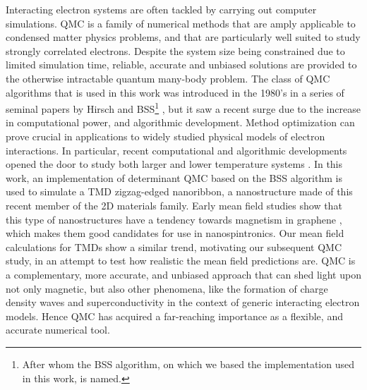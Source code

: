 Interacting electron systems are often tackled by carrying out computer simulations.
\ac{QMC} is a family of numerical methods that are  amply applicable to condensed matter physics problems, and that are particularly well suited to study strongly correlated electrons.
Despite the system size being constrained due to limited simulation time, reliable, accurate and unbiased solutions are provided to the otherwise intractable quantum many-body problem.
The class of \acs{QMC} algorithms that is used in this work was introduced in the 1980's in a series of seminal papers by Hirsch and \acl{BSS}\footnote{After whom the \ac{BSS} algorithm, on which we based the implementation used in this work, is named.} \cite{hirsch_discrete_1983, hirsch_monte_1982, blankenbecler_monte_1981, hirsch_two-dimensional_1985, hirsch_monte_1983, hirsch_stable_1988, hirsch_antiferromagnetism_1989}, but it saw a recent surge \cite{dumitrescu_superconductivity_2016, berg_monte_2018, beyl_revisiting_2018, chang_recent_2015, esterlis_breakdown_2018, mondaini_determinant_2012, meng_characterization_2014, kung_characterizing_2016, johnston_determinant_2013, rademaker_determinant_2013, ying_determinant_2014, scalettar_numerical_2007, zhou_quantum_2014} due to the increase in computational power, and algorithmic development.
Method optimization can prove crucial in applications to widely studied physical models of electron interactions.
In particular, recent computational and algorithmic developments opened the door to study both larger and lower temperature systems \cite{jiang_fast_2016, lee_parallelization_2010, chang_recent_2015, bai_stable_2011}.
In this work, an implementation of determinant \acs{QMC} based on the \ac{BSS} algorithm is used to simulate a \ac{TMD} zigzag-edged nanoribbon, a nanostructure made of this recent member of the \acs{2D} materials family.
Early mean field studies show that this type of nanostructures have a tendency towards magnetism in graphene \cite{yazyev_emergence_2010}, which makes them good candidates for use in nanospintronics.
Our mean field calculations for \acp{TMD} show a similar trend, motivating our subsequent \acs{QMC} study, in an attempt to test how realistic the mean field predictions are.
\acs{QMC} is a complementary, more accurate, and unbiased approach that can shed light upon not only magnetic, but also  other phenomena, like the formation of charge density waves and superconductivity in the context of generic interacting electron models. Hence \acs{QMC} has acquired a far-reaching importance as a flexible, and accurate numerical tool.